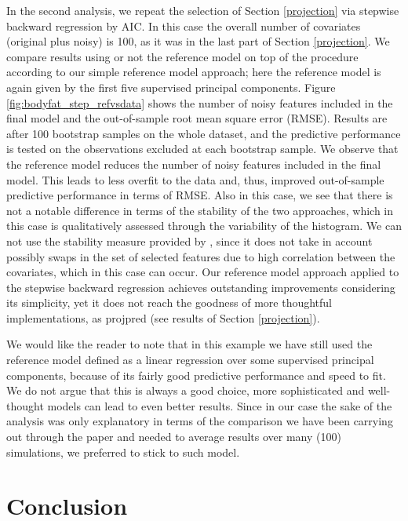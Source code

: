 \documentclass[american,]{article}
\theoremstyle{definition}
\begin{document}
In the second analysis, we repeat the selection of Section \ref{projection} via stepwise backward regression by AIC. In this case the overall number of covariates (original plus noisy) is 100, as it was in the last part of Section \ref{projection}. We compare results using or not the reference model on top of the procedure according to our simple reference model approach; here the reference model is again given by the first five supervised principal components. Figure \ref{fig:bodyfat_step_refvsdata} shows the number of noisy features included in the final model and the out-of-sample root mean square error (RMSE). Results are after 100 bootstrap samples on the whole dataset, and the predictive performance is tested on the observations excluded at each bootstrap sample. We observe that the reference model reduces the number of noisy features included in the final model. This leads to less overfit to the data and, thus, improved out-of-sample predictive performance in terms of RMSE. Also in this case, we see that there is not a notable difference in terms of the stability of the two approaches, which in this case is qualitatively assessed through the variability of the histogram. We can not use the stability measure provided by \cite{paper:stability}, since it does not take in account possibly swaps in the set of selected features due to high correlation between the covariates, which in this case can occur. Our reference model approach applied to the stepwise backward regression achieves outstanding improvements considering its simplicity, yet it does not reach the goodness of more thoughtful implementations, as projpred (see results of Section \ref{projection}). 

We would like the reader to note that in this example we have still used the reference model defined as a linear regression over some supervised principal components, because of its fairly good predictive performance and speed to fit. We do not argue that this is always a good choice, more sophisticated and well-thought models can lead to even better results. Since in our case the sake of the analysis was only explanatory in terms of the comparison we have been carrying out through the paper and needed to average results over many (100) simulations, we preferred to stick to such model.




\hypertarget{conclusion}{%
\section{Conclusion}\label{conclusion}}
\end{document}
